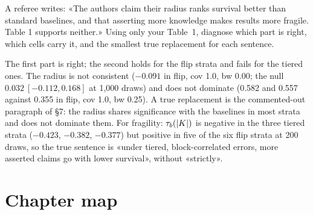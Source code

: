 \begin{exercicio}[metodo=diagnosis,conceito=frases-proibidas]
A referee writes: «The authors claim their radius ranks survival better than standard baselines, and that
asserting more knowledge makes results more fragile. Table 1 supports neither.» Using only your Table~1,
diagnose which part is right, which cells carry it, and the smallest true replacement for each sentence.
\end{exercicio}
\begin{solucao}
The first part is right; the second holds for the flip strata and fails for the tiered ones. The radius is not consistent ($-0.091$ in flip, cov 1.0, bw 0.00; the null
$0.032\ [-0.112, 0.168]$ at 1,000 draws) and does not dominate (0.582 and 0.557 against 0.355 in flip, cov
1.0, bw 0.25). A true replacement is the commented-out paragraph of \S7: the radius shares significance with
the baselines in most strata and does not dominate them. For fragility: $\tau_b(|K|)$ is negative in the three tiered strata ($-0.423$, $-0.382$,
$-0.377$) but positive in five of the six flip strata at 200 draws, so the true sentence is «under
tiered, block-correlated errors, more asserted claims go with lower survival», without «strictly».
\end{solucao}

\section*{Chapter map}
\begin{center}
\end{center}
